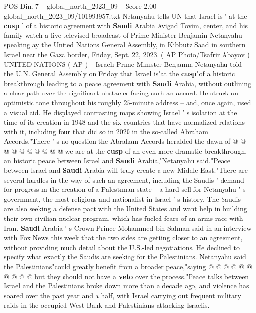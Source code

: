 \begin{textsample}{POS Dim 7 – global\_north\_2023\_09 – Score 2.00 – global\_north\_2023\_09/101993957.txt}  \label{ex:f7_pos_282}
Netanyahu tells UN that Israel is ' at the \textbf{cusp} ' of a historic agreement with \textbf{Saudi} Arabia Avigad Tovim, center, and his family watch a live televised broadcast of Prime Minister Benjamin Netanyahu speaking ay the United Nations General Assembly, in Kibbutz Saad in southern Israel near the Gaza border, Friday, Sept. 22, 2023. ( AP Photo/Tsafrir Abayov ) UNITED NATIONS ( AP ) -- Israeli Prime Minister Benjamin Netanyahu told the U.N.
General Assembly on Friday that Israel is"at the \textbf{cusp}"of a historic breakthrough leading to a peace agreement with \textbf{Saudi} Arabia, without outlining a clear path over the significant obstacles facing such an accord.
He struck an optimistic tone throughout his roughly 25-minute address -- and, once again, used a visual aid.
He displayed contrasting maps showing Israel ' s isolation at the time of its creation in 1948 and the six countries that have normalized relations with it, including four that did so in 2020 in the so-called Abraham Accords."There ' s no question the Abraham Accords heralded the dawn of @ @ @ @ @ @ @ @ @ @ we are at the \textbf{cusp} of an even more dramatic breakthrough, an historic peace between Israel and \textbf{Saudi} Arabia,"Netanyahu said."Peace between Israel and \textbf{Saudi} Arabia will truly create a new Middle East."There are several hurdles in the way of such an agreement, including the Saudis ' demand for progress in the creation of a Palestinian state -- a hard sell for Netanyahu ' s government, the most religious and nationalist in Israel ' s history.
The Saudis are also seeking a defense pact with the United States and want help in building their own civilian nuclear program, which has fueled fears of an arms race with Iran. \textbf{Saudi} Arabia ' s Crown Prince Mohammed bin Salman said in an interview with Fox News this week that the two sides are getting closer to an agreement, without providing much detail about the U.S.-led negotiations.
He declined to specify what exactly the Saudis are seeking for the Palestinians.
Netanyahu said the Palestinians"could greatly benefit from a broader peace,"saying @ @ @ @ @ @ @ @ @ @ but they should not have a \textbf{veto} over the process."Peace talks between Israel and the Palestinians broke down more than a decade ago, and violence has soared over the past year and a half, with Israel carrying out frequent military raids in the occupied West Bank and Palestinians attacking Israelis.

\end{textsample}
